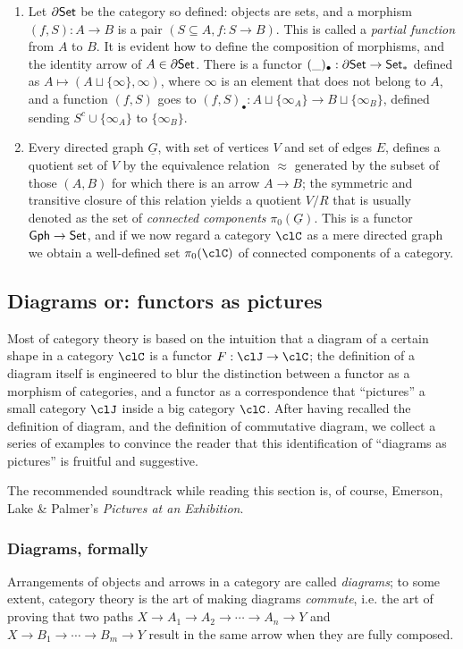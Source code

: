 \documentclass[11pt]{article}
\begin{document}
\begin{example}
\begin{enumerate}
		\item  Let $\partial\mathsf{Set}$ be the category so defined: objects are sets, and a morphism $(f,S) : A \to B$ is  a pair $(S \subseteq A, f : S \to B)$. This is called a \emph{partial function} from $A$ to $B$. It is evident how to define the composition of morphisms, and the identity arrow of $A \in\partial\mathsf{Set}$. There is a functor $(\_)_\bullet : \partial\mathsf{Set} \to \mathsf{Set}_*$ defined as $A\mapsto (A\sqcup \{\infty\}, \infty)$, where $\infty$ is an element that does not belong to $A$, and a function $(f,S)$ goes to $(f,S)_\bullet : A\sqcup \{\infty_A\} \to B\sqcup\{\infty_B\}$, defined sending $S^c\cup \{\infty_A\}$ to $\{\infty_B\}$.
		\item  Every directed graph $\underline G$, with set of vertices $V$ and set of edges $E$, defines a quotient set of $V$ by the equivalence relation $\approx$ generated by the subset of those $(A, B)$ for which there is an arrow $A\to B$; the symmetric and transitive closure of this relation yields a quotient $V/R$ that is usually denoted as the set of \emph{connected components} $\pi_0(\underline G)$. This is a functor $\mathsf{Gph} \to \mathsf{Set}$, and if we now regard a category $\clC$ as a mere directed graph we obtain a well-defined set $\pi_0(\clC)$ of connected components of a category.
	\end{enumerate}
\end{example}

\subsection{Diagrams or: functors as pictures}
Most of category theory is based on the intuition that a diagram of a certain shape in a category $\clC$ is a functor $F : \clJ \to \clC$; the definition of a diagram itself is engineered to blur the distinction between a functor as a morphism of categories, and a functor as a correspondence that ``pictures'' a small category $\clJ$ inside a big category $\clC$. After having recalled the definition of diagram, and the definition of commutative diagram, we collect a series of examples to convince the reader that this identification of ``diagrams as pictures'' is fruitful and suggestive.

The recommended soundtrack while reading this section is, of course, Emerson, Lake \& Palmer's \emph{Pictures at an Exhibition}.

\subsubsection{Diagrams, formally}
Arrangements of objects and arrows in a category are called \emph{diagrams}; to some extent, category theory is the art of making diagrams \emph{commute}, i.e. the art of proving that two paths $X\to A_1\to A_2 \to\cdots\to A_n \to Y$ and $X \to B_1\to\cdots\to B_m \to Y$ result in the same arrow when they are fully composed.
\end{document}
